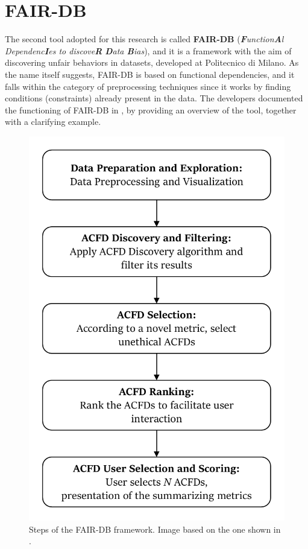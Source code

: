 \section{FAIR-DB}
\label{section:fair-db}
The second tool adopted for this research is called \textbf{FAIR-DB} (\textit{\textbf{F}unction\textbf{A}l Dependenc\textbf{I}es to discove\textbf{R} \textbf{D}ata \textbf{B}ias}), and it is a framework with the aim of discovering unfair behaviors in datasets, developed at Politecnico di Milano. As the name itself suggests, FAIR-DB is based on functional dependencies, and it falls within the category of preprocessing techniques since it works by finding conditions (constraints) already present in the data. The developers documented the functioning of FAIR-DB in \cite{azzalini2021fair}, by providing an overview of the tool, together with a clarifying example.

\begin{figure}[t!]
\includegraphics[scale=.65]{figures/fair-db_framework.pdf}
\centering
\caption{Steps of the FAIR-DB framework. Image based on the one shown in \cite{azzalini2021fair}.}
\label{fig:fair-db_framework}
\end{figure}

